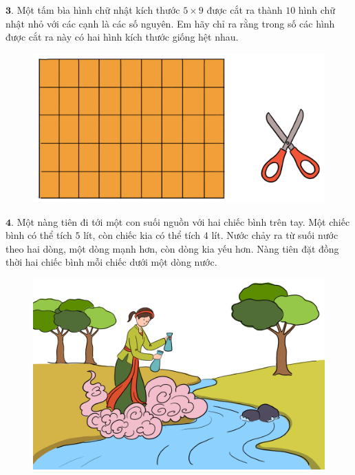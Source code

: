 \begin{multicols}{2}
\begin{figure}[H]
		\vspace*{-15pt}
	\end{figure}
	$\pmb{3.}$ Một tấm bìa hình chữ nhật kích thước $5\times 9$ được cắt ra thành $10$ hình chữ nhật nhỏ với các cạnh là các số nguyên. Em hãy chỉ ra rằng trong số các hình được cắt ra này có hai hình kích thước giống hệt nhau.
	\begin{figure}[H]
		\centering
		\vspace*{-5pt}
		\captionsetup{labelformat= empty, justification=centering}
		\includegraphics[width=1\linewidth]{Pi10_bai3}
		\vspace*{-15pt}
	\end{figure}
	$\pmb{4.}$ Một nàng tiên đi tới một con suối nguồn với hai chiếc bình trên tay. Một chiếc bình có thể tích $5$ lít, còn chiếc kia có thể tích $4$ lít. Nước chảy ra từ suối nước theo hai dòng, một dòng mạnh hơn, còn dòng kia yếu hơn. Nàng tiên đặt đồng thời hai chiếc bình mỗi chiếc dưới một dòng nước.
	\begin{figure}[H]
		\centering
		\vspace*{-5pt}
		\captionsetup{labelformat= empty, justification=centering}
		\includegraphics[width=1\linewidth]{Pi10_bai4}

\end{figure}
\end{multicols}
